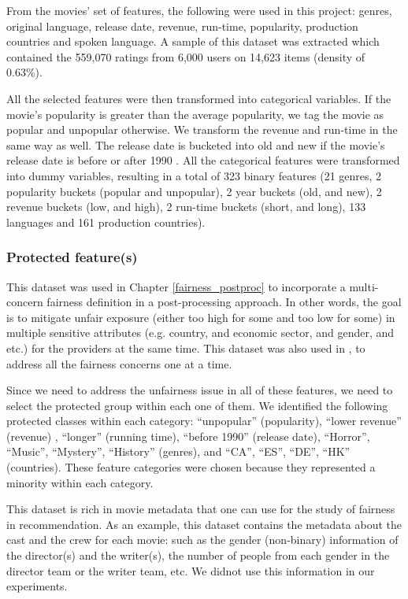     From the movies' set of features, the following were used in this project: genres, original language, release date, revenue, run-time, popularity, production countries and spoken language. A sample of this dataset was extracted which contained the 559,070 ratings from 6,000 users on 14,623 items (density of 0.63\%).

    All the selected features were then transformed into categorical variables. If the movie's popularity is greater than the average popularity, we tag the movie as popular and unpopular otherwise. We transform the revenue and run-time in the same way as well. The release date is bucketed into old and new if the movie's release date is before or after 1990 \cite{kamishima2016model}. All the categorical features were transformed into dummy variables, resulting in a total of 323 binary features (21 genres, 2 popularity buckets (popular and unpopular), 2 year buckets (old, and new), 2 revenue buckets (low, and high), 2 run-time buckets (short, and long), 133 languages and 161 production countries).
    
        \subsubsection{Protected feature(s)}

        This dataset was used in Chapter \ref{fairness_postproc}  to incorporate a multi-concern fairness definition in a post-processing approach. In other words, the goal is to mitigate unfair exposure (either too high for some and too low for some) in multiple sensitive attributes (e.g. country, and economic sector, and gender, and etc.) for the providers at the same time. This dataset was also used in , to address all the fairness concerns one at a time.
    
        Since we need to address the unfairness issue in all of these features, we need to select the protected group within each one of them.
        We identified the following protected classes within each category: ``unpopular'' (popularity), ``lower revenue'' (revenue) , ``longer'' (running time), ``before 1990'' (release date), ``Horror'', ``Music'', ``Mystery'', ``History'' (genres), and ``CA'', ``ES'', ``DE'', ``HK'' (countries). These feature categories were chosen because they represented a minority within each category.
    
        This dataset is rich in movie metadata that one can use for the study of fairness in recommendation. As an example, this dataset contains the metadata about the cast and the crew for each movie: such as the gender (non-binary) information of the director(s) and the writer(s), the number of people from each gender in the director team or the writer team, etc. We didnot use this information in our experiments.

